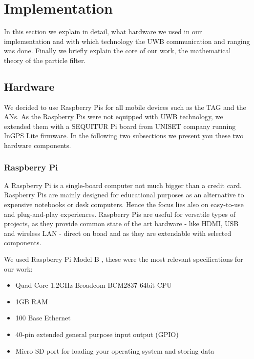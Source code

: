 
\chapter{Implementation} %

\label{Chapter4} %
In this section we explain in detail, what hardware we used in our implementation and with which technology the UWB communication and ranging was done. Finally we briefly explain the core of our work, the mathematical theory of the particle filter.


\section{Hardware}
We decided to use Raspberry Pis for all mobile devices such as the TAG and the ANs. As the Raspberry Pis were not equipped with UWB technology, we extended them with a SEQUITUR Pi board from UNISET company running InGPS Lite firmware. In the following two subsections we present you these two hardware components.

\subsection{Raspberry Pi}
A Raspberry Pi is a single-board computer not much bigger than a credit card. Raspberry Pis are mainly designed for educational purposes as an alternative to expensive notebooks or desk computers. Hence the focus lies also on easy-to-use and plug-and-play experiences. Raspberry Pis are useful for versatile types of projects, as they provide common state of the art hardware - like HDMI, USB and wireless LAN - direct on boad and as they are extendable with selected components.

We used Raspberry Pi Model B \cite{Raspberry}, these were the most relevant specifications for our work:
\begin{itemize}
\item Quad Core 1.2GHz Broadcom BCM2837 64bit CPU
\item1GB RAM
\item 100 Base Ethernet
\item 40-pin extended general purpose input output (GPIO)
\item Micro SD port for loading your operating system and storing data
\end{itemize}

